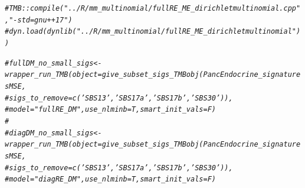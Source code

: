 \documentclass{article}\usepackage[]{graphicx}\usepackage[]{xcolor}
\makeatletter
\newcommand{\hlcom}[1]{\textcolor[rgb]{0.678,0.584,0.686}{\textit{#1}}}%
\newenvironment{kframe}{%
 \def\at@end@of@kframe{}%
 \ifinner\ifhmode%
  \def\at@end@of@kframe{\end{minipage}}%
  \begin{minipage}{\columnwidth}%
 \fi\fi%
 \def\FrameCommand##1{\hskip\@totalleftmargin \hskip-\fboxsep
 \colorbox{shadecolor}{##1}\hskip-\fboxsep
     \hskip-\linewidth \hskip-\@totalleftmargin \hskip\columnwidth}%
 \MakeFramed {\advance\hsize-\width
   \@totalleftmargin\z@ \linewidth\hsize
   \@setminipage}}%
 {\par\unskip\endMakeFramed%
 \at@end@of@kframe}
\newenvironment{knitrout}{}{} %
\makeatother
\begin{document}
\begin{knitrout}
\color{fgcolor}\begin{kframe}
\begin{alltt}
\hlcom{# TMB::compile("../R/mm_multinomial/fullRE_ME_dirichletmultinomial.cpp",  "-std=gnu++17")}
\hlcom{# dyn.load(dynlib("../R/mm_multinomial/fullRE_ME_dirichletmultinomial"))}


\hlcom{# fullDM_no_small_sigs <- wrapper_run_TMB(object = give_subset_sigs_TMBobj(PancEndocrine_signaturesMSE,}
\hlcom{#                            sigs_to_remove = c('SBS13', 'SBS17a', 'SBS17b', 'SBS30')),}
\hlcom{#                                         model = "fullRE_DM", use_nlminb=T, smart_init_vals=F)}
\hlcom{# }
\hlcom{# diagDM_no_small_sigs <- wrapper_run_TMB(object = give_subset_sigs_TMBobj(PancEndocrine_signaturesMSE,}
\hlcom{#                            sigs_to_remove = c('SBS13', 'SBS17a', 'SBS17b', 'SBS30')),}
\hlcom{#                                         model = "diagRE_DM", use_nlminb=T, smart_init_vals=F)}


\end{alltt}
\end{kframe}
\end{knitrout}
\end{document}
